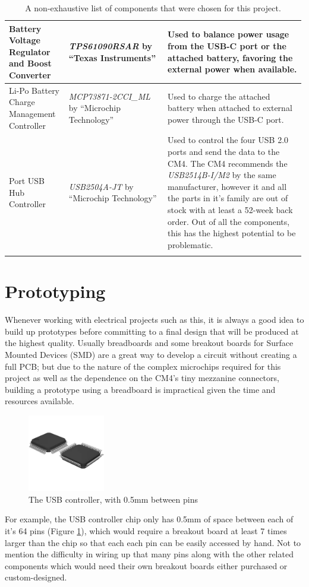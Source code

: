 \begin{longtable}{|>{\raggedright\arraybackslash}p{0.2\linewidth}|>{\raggedright\arraybackslash}p{0.33\linewidth}|>{\raggedright\arraybackslash}p{0.46\linewidth}|}
  \hline
  Battery Voltage Regulator and Boost Converter & \emph{TPS61090RSAR} by \enquote{Texas Instruments} & Used to balance power usage from the USB-C port or the attached battery, favoring the external power when available. \\
  \hline
  Li-Po Battery Charge Management Controller & \emph{MCP73871-2CCI\_ML} by \enquote{Microchip Technology} & Used to charge the attached battery when attached to external power through the USB-C port. \\
  \hline
  4 Port USB Hub Controller & \emph{USB2504A-JT} by \enquote{Microchip Technology} & Used to control the four USB 2.0 ports and send the data to the CM4. The CM4 recommends the \emph{USB2514B-I/M2} by the same manufacturer, however it and all the parts in it's family are out of stock with at least a 52-week back order. Out of all the components, this has the highest potential to be problematic.\\
  \hline
  \caption[Selected PCB Components]{A non-exhaustive list of components that were chosen for this project.}
  \label{tab:SelectedComponents}
\end{longtable}

\section{Prototyping}\label{sec:Prototyping}

Whenever working with electrical projects such as this, it is always a good idea to build up prototypes before committing to a final design that will be produced at the highest quality.
Usually breadboards and some breakout boards for Surface Mounted Devices (SMD) are a great way to develop a circuit without creating a full PCB; but due to the nature of the complex microchips required for this project as well as the dependence on the CM4's tiny mezzanine connectors, building a prototype using a breadboard is impractical given the time and resources available.
\begin{figure}
  \centering
  \includegraphics[width=0.3\textwidth]{Figures/64-LQFP}
  \caption[USB Controller]{The USB controller, with 0.5mm between pins}
  \label{fig:USBController}
\end{figure}
For example, the USB controller chip only has 0.5mm of space between each of it's 64 pins (Figure \ref{fig:USBController}), which would require a breakout board at least 7 times larger than the chip so that each each pin can be easily accessed by hand.
Not to mention the difficulty in wiring up that many pins along with the other related components which would need their own breakout boards either purchased or custom-designed.

